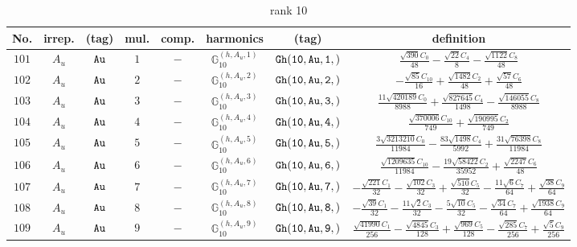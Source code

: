 \documentclass[fleqn,8pt]{jsarticle}
\begin{document}
\begin{table}[ht!]
\begin{center}
\caption{rank 10}
\renewcommand{\arraystretch}{1.3}
\begin{tabular}{cccccccc} \hline \hline
No. & irrep. & (tag) & mul. & comp. & harmonics & (tag) & definition \\ \hline
$ 101 $ & $ A_{u} $ & $ {\tt Au} $ & $ 1 $ & $ - $ & $ \mathbb{G}_{10}^{(h,A_{u},1)} $ & $ {\tt Gh(10,Au,1,)} $ & $ \frac{\sqrt{390} C_{0}}{48} - \frac{\sqrt{22} C_{4}}{8} - \frac{\sqrt{1122} C_{8}}{48} $ \\
$ 102 $ & $ A_{u} $ & $ {\tt Au} $ & $ 2 $ & $ - $ & $ \mathbb{G}_{10}^{(h,A_{u},2)} $ & $ {\tt Gh(10,Au,2,)} $ & $ - \frac{\sqrt{85} C_{10}}{16} + \frac{\sqrt{1482} C_{2}}{48} + \frac{\sqrt{57} C_{6}}{48} $ \\
$ 103 $ & $ A_{u} $ & $ {\tt Au} $ & $ 3 $ & $ - $ & $ \mathbb{G}_{10}^{(h,A_{u},3)} $ & $ {\tt Gh(10,Au,3,)} $ & $ \frac{11 \sqrt{420189} C_{0}}{8988} + \frac{\sqrt{827645} C_{4}}{1498} - \frac{\sqrt{146055} C_{8}}{8988} $ \\
$ 104 $ & $ A_{u} $ & $ {\tt Au} $ & $ 4 $ & $ - $ & $ \mathbb{G}_{10}^{(h,A_{u},4)} $ & $ {\tt Gh(10,Au,4,)} $ & $ \frac{\sqrt{370006} C_{10}}{749} + \frac{\sqrt{190995} C_{2}}{749} $ \\
$ 105 $ & $ A_{u} $ & $ {\tt Au} $ & $ 5 $ & $ - $ & $ \mathbb{G}_{10}^{(h,A_{u},5)} $ & $ {\tt Gh(10,Au,5,)} $ & $ \frac{3 \sqrt{3213210} C_{0}}{11984} - \frac{83 \sqrt{1498} C_{4}}{5992} + \frac{31 \sqrt{76398} C_{8}}{11984} $ \\
$ 106 $ & $ A_{u} $ & $ {\tt Au} $ & $ 6 $ & $ - $ & $ \mathbb{G}_{10}^{(h,A_{u},6)} $ & $ {\tt Gh(10,Au,6,)} $ & $ \frac{\sqrt{1209635} C_{10}}{11984} - \frac{19 \sqrt{58422} C_{2}}{35952} + \frac{\sqrt{2247} C_{6}}{48} $ \\
$ 107 $ & $ A_{u} $ & $ {\tt Au} $ & $ 7 $ & $ - $ & $ \mathbb{G}_{10}^{(h,A_{u},7)} $ & $ {\tt Gh(10,Au,7,)} $ & $ - \frac{\sqrt{221} C_{1}}{32} - \frac{\sqrt{102} C_{3}}{32} + \frac{\sqrt{510} C_{5}}{32} - \frac{11 \sqrt{6} C_{7}}{64} + \frac{\sqrt{38} C_{9}}{64} $ \\
$ 108 $ & $ A_{u} $ & $ {\tt Au} $ & $ 8 $ & $ - $ & $ \mathbb{G}_{10}^{(h,A_{u},8)} $ & $ {\tt Gh(10,Au,8,)} $ & $ - \frac{\sqrt{39} C_{1}}{32} - \frac{11 \sqrt{2} C_{3}}{32} - \frac{5 \sqrt{10} C_{5}}{32} - \frac{\sqrt{34} C_{7}}{64} + \frac{\sqrt{1938} C_{9}}{64} $ \\
$ 109 $ & $ A_{u} $ & $ {\tt Au} $ & $ 9 $ & $ - $ & $ \mathbb{G}_{10}^{(h,A_{u},9)} $ & $ {\tt Gh(10,Au,9,)} $ & $ \frac{\sqrt{41990} C_{1}}{256} - \frac{\sqrt{4845} C_{3}}{128} + \frac{\sqrt{969} C_{5}}{128} - \frac{\sqrt{285} C_{7}}{256} + \frac{\sqrt{5} C_{9}}{256} $ \\

\end{tabular}
\end{center}
\end{table}
\end{document}

